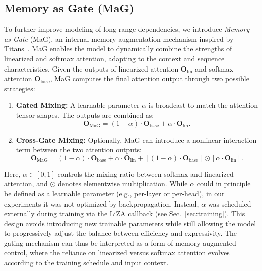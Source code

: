 \documentclass[10pt,a4paper]{article}
\begin{document}
\subsection{Memory as Gate (MaG)}
To further improve modeling of long-range dependencies, we introduce \textit{Memory as Gate} (MaG), an internal memory augmentation mechanism inspired by Titans~\cite{behrouz2024titans}. MaG enables the model to dynamically combine the strengths of linearized and softmax attention, adapting to the context and sequence characteristics. Given the outputs of linearized attention $\mathbf{O}_{\text{lin}}$ and softmax attention $\mathbf{O}_{\text{base}}$, MaG computes the final attention output through two possible strategies:
\begin{enumerate}
    \item \textbf{Gated Mixing:} A learnable parameter $\alpha$ is broadcast to match the attention tensor shapes. The outputs are combined as:
    \begin{equation}
        \mathbf{O}_{\text{MaG}} = (1-\alpha) \cdot \mathbf{O}_{\text{base}} + \alpha \cdot \mathbf{O}_{\text{lin}} .
    \end{equation}
    \item \textbf{Cross-Gate Mixing:} Optionally, MaG can introduce a nonlinear interaction term between the two attention outputs:
    \begin{equation}
        \mathbf{O}_{\text{MaG}} = (1-\alpha) \cdot \mathbf{O}_{\text{base}} + \alpha \cdot \mathbf{O}_{\text{lin}} + \left[(1-\alpha) \cdot \mathbf{O}_{\text{base}}\right] \odot \left[\alpha \cdot \mathbf{O}_{\text{lin}}\right] .
    \end{equation}
\end{enumerate}

Here, $\alpha \in [0,1]$ controls the mixing ratio between softmax and linearized attention, and $\odot$ denotes elementwise multiplication. While $\alpha$ could in principle be defined as a learnable parameter (e.g., per-layer or per-head), in our experiments it was not optimized by backpropagation. Instead, $\alpha$ was scheduled externally during training via the LiZA callback (see Sec.~\ref{sec:training}). This design avoids introducing new trainable parameters while still allowing the model to progressively adjust the balance between efficiency and expressivity. The gating mechanism can thus be interpreted as a form of memory-augmented control, where the reliance on linearized versus softmax attention evolves according to the training schedule and input context.
\end{document}
